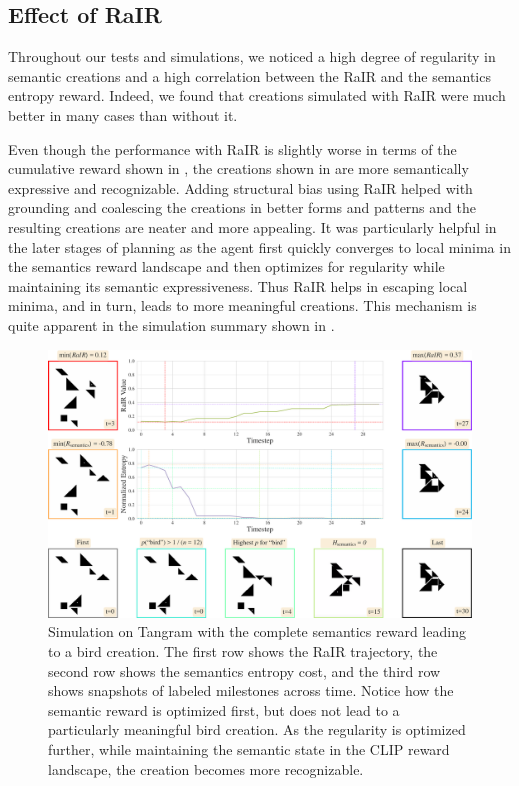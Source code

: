 \newpage
\subsection{Effect of RaIR}
\label{sec:effect-rair}

Throughout our tests and simulations, we noticed a high degree of regularity in semantic creations and a high correlation between the RaIR and the semantics entropy reward. 
Indeed, we found that creations simulated with RaIR were much better in many cases than without it.

Even though the performance with RaIR is slightly worse in terms of the cumulative reward shown in , the creations shown in  are more semantically expressive and recognizable.
Adding structural bias using RaIR helped with grounding and coalescing the creations in better forms and patterns and the resulting creations are neater and more appealing.
It was particularly helpful in the later stages of planning as the agent first quickly converges to local minima in the semantics reward landscape and then optimizes for regularity while maintaining its semantic expressiveness.
Thus RaIR helps in escaping local minima, and in turn, leads to more meaningful creations.
This mechanism is quite apparent in the simulation summary shown in .

\begin{figure}[h]
    \centering
    \includegraphics[width=\textwidth]{images/sim_rair_later_bird_cropped.pdf}
    \caption[Simulation on Tangram with the complete semantics reward leading to a bird creation.]{Simulation on Tangram with the complete semantics reward leading to a bird creation. The first row shows the RaIR trajectory, the second row shows the semantics entropy cost, and the third row shows snapshots of labeled milestones across time. Notice how the semantic reward is optimized first, but does not lead to a particularly meaningful bird creation. As the regularity is optimized further, while maintaining the semantic state in the CLIP reward landscape, the creation becomes more recognizable.}
    \label{fig:sim}
\end{figure}

